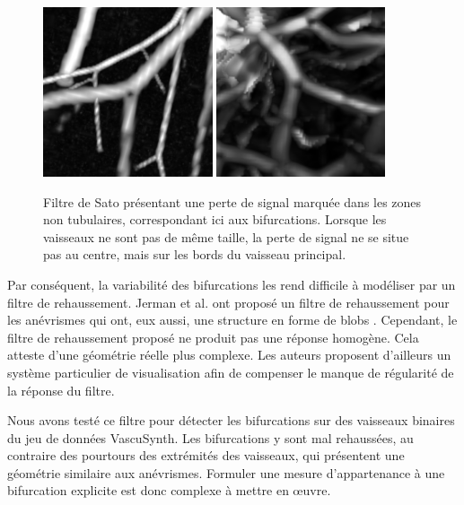 \begin{figure}[!ht]
    \centering
    \includegraphics[height=5cm]{Images/Vascu_2_k_Sato.png}
    \includegraphics[height=5cm]{Images/Ircad_k_Sato.png}
    \caption{Filtre de Sato présentant une perte de signal marquée dans les zones non tubulaires, correspondant ici aux bifurcations. Lorsque les vaisseaux ne sont pas de même taille, la perte de signal ne se situe pas au centre, mais sur les bords du vaisseau principal.}
    \label{fig:gradient_shift}
\end{figure}

Par conséquent, la variabilité des bifurcations les rend difficile à modéliser par un filtre de rehaussement. Jerman et al. ont proposé un filtre de rehaussement pour les anévrismes qui ont, eux aussi, une structure en forme de blobs \cite{Jerman2015_blobness}. Cependant, le filtre de rehaussement proposé ne produit pas une réponse homogène. Cela atteste d'une géométrie réelle plus complexe. Les auteurs proposent d'ailleurs un système particulier de visualisation afin de compenser le manque de régularité de la réponse du filtre.

Nous avons testé ce filtre pour détecter les bifurcations sur des vaisseaux binaires du jeu de données VascuSynth. Les bifurcations y sont mal rehaussées, au contraire des pourtours des extrémités des vaisseaux, qui présentent une géométrie similaire aux anévrismes. Formuler une mesure d'appartenance à une bifurcation explicite est donc complexe à mettre en œuvre.  


